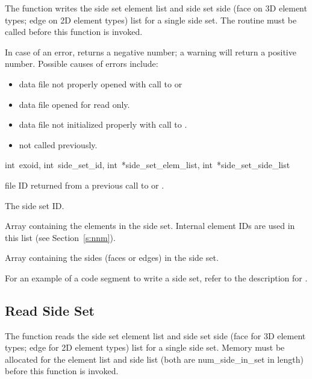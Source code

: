 The function  writes the side set element
list and side set side (face on 3D element types; edge on 2D element
types) list for a single side set. The routine
 must be called before this function
is invoked.

In case of an error,  returns a negative
number; a warning will return a positive number.  Possible causes of
errors include:

\begin{itemize}
 \item data file not properly opened with call to  
or 

 \item data file opened for read only.

 \item data file not initialized properly with call to .

 \item {} not called previously.
\end{itemize}

{int~exoid, 
int~side_set_id, 
int~*side_set_elem_list, 
int~*side_set_side_list}

\begin{parameters}
\item[int exoid \R{}]
\exo{} file ID returned from a previous call to  
or .

\item[{int side_set_id \R{}}]
The side set ID.

\item[int* side_set_elem_list \R{}]
Array containing the elements in the side set. Internal element 
IDs are used in this list (see  Section~\ref{s:nnm}).

\item[int* side_set_side_list \R{}]
Array containing the sides (faces or edges) in the side set.
\end{parameters}

For an example of a code segment to write a side set, refer 
to the description for .

\subsection{Read Side Set}

The function  reads the side set element
list and side set side (face for 3D element types; edge for 2D
element types) list for a single side set. Memory must be allocated
for the element list and side list (both are {num_side_in_set} in
length) before this function is invoked.


